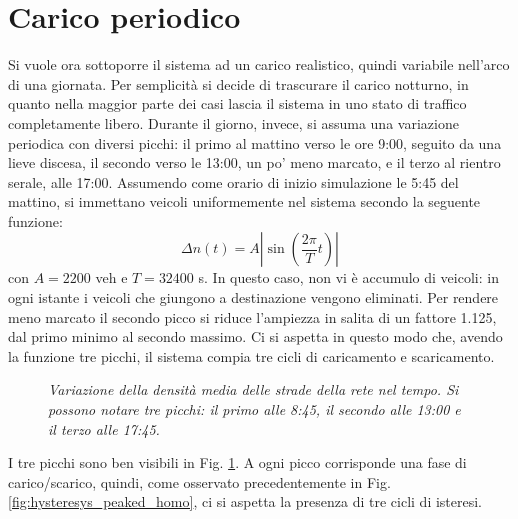 \documentclass[../main.tex]{subfiles}
\begin{document}
\section{Carico periodico}
Si vuole ora sottoporre il sistema ad un carico realistico, quindi variabile nell'arco di una giornata.
Per semplicit\`a si decide di trascurare il carico notturno, in quanto nella maggior parte dei casi lascia il sistema in uno stato di traffico completamente libero.
Durante il giorno, invece, si assuma una variazione periodica con diversi picchi: il primo al mattino verso le ore 9:00, seguito da una lieve discesa, il secondo verso le 13:00, un po' meno marcato, e il terzo al rientro serale, alle 17:00.
Assumendo come orario di inizio simulazione le 5:45 del mattino, si immettano veicoli uniformemente nel sistema secondo la seguente funzione:
\begin{equation}
    \Delta n(t) = A \left\lvert \sin\left(\frac{2\pi}{T}t\right) \right\rvert 
\end{equation}
con $A = 2200$ veh e $T = 32400$ s.
In questo caso, non vi \`e accumulo di veicoli: in ogni istante i veicoli che giungono a destinazione vengono eliminati.
Per rendere meno marcato il secondo picco si riduce l'ampiezza in salita di un fattore 1.125, dal primo minimo al secondo massimo.
Ci si aspetta in questo modo che, avendo la funzione tre picchi, il sistema compia tre cicli di caricamento e scaricamento.
\begin{figure}[H]
    \centering
    \caption[Variazione periodica della densit\`a in un reticolo omogeneo]{\emph{Variazione della densit\`a media delle strade della rete nel tempo. Si possono notare tre picchi: il primo alle 8:45, il secondo alle 13:00 e il terzo alle 17:45.}}
    \label{fig:density_time_periodic_homo}
\end{figure}
I tre picchi sono ben visibili in Fig. \ref{fig:density_time_periodic_homo}.
A ogni picco corrisponde una fase di carico/scarico, quindi, come osservato precedentemente in Fig. \ref{fig:hysteresys_peaked_homo}, ci si aspetta la presenza di tre cicli di isteresi.
\end{document}
